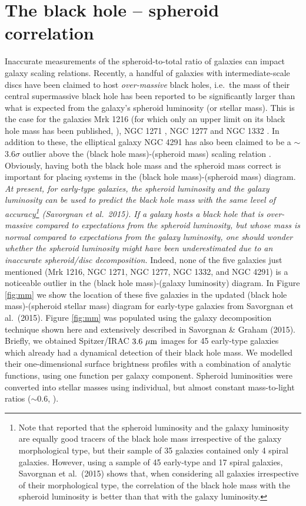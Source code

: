 \documentclass[useAMS,usenatbib,article]{mnras}
\begin{document}
\section{The black hole -- spheroid correlation}
\label{sec:mm}
Inaccurate measurements of the spheroid-to-total ratio of galaxies can impact galaxy scaling relations. 
Recently, a handful of galaxies with intermediate-scale discs have been claimed to host \emph{over-massive} black holes, 
i.e.~the mass of their central supermassive black hole has been reported to be significantly larger 
than what is expected from the galaxy's spheroid luminosity (or stellar mass).
This is the case for the galaxies Mrk 1216 (for which only an upper limit on its black hole mass has been published, 
\citealt{yildirim2015}), NGC 1271 \citep{walsh2015}, 
NGC 1277 \citep{vandenbosch2012,yildirim2015} and NGC 1332 \citep{rusli2011}.
In addition to these, the elliptical galaxy NGC 4291 has also been claimed to be a $\sim$$3.6\sigma$ outlier 
above the (black hole mass)-(spheroid mass) scaling relation \citep{bogdan2012}. 
Obviously, having both the black hole mass and the spheroid mass correct is important 
for placing systems in the (black hole mass)-(spheroid mass) diagram. \\
\emph{At present, for early-type galaxies, the spheroid luminosity and the galaxy luminosity 
can be used to predict the black hole mass with the same level of accuracy\footnote{Note that 
\cite{lasker2014anal} reported that the spheroid luminosity and the galaxy luminosity are equally good tracers of the black hole mass 
irrespective of the galaxy morphological type, but their sample of 35 galaxies contained only 4 spiral galaxies. 
However, using a sample of 45 early-type and 17 spiral galaxies, 
Savorgnan et al.~(2015) shows that, when considering all galaxies irrespective of their morphological type, 
the correlation of the black hole mass with the spheroid luminosity is better than that with the galaxy luminosity.} 
(Savorgnan et al.~2015). 
If a galaxy hosts a black hole that is over-massive compared to expectations from the spheroid luminosity, 
but whose mass is normal compared to expectations from the galaxy luminosity, 
one should wonder whether the spheroid luminosity might have been underestimated 
due to an inaccurate spheroid/disc decomposition. }
Indeed, none of the five galaxies just mentioned (Mrk 1216, NGC 1271, NGC 1277, NGC 1332, and NGC 4291) is a noticeable outlier 
in the (black hole mass)-(galaxy luminosity) diagram. 
In Figure \ref{fig:mm} we show the location of these five galaxies in the updated (black hole mass)-(spheroid stellar mass) diagram 
for early-type galaxies from Savorgnan et al.~(2015). 
Figure \ref{fig:mm} was populated using the galaxy decomposition technique shown here 
and extensively described in Savorgnan \& Graham (2015). 
Briefly, we obtained Spitzer/IRAC $3.6~\rm \mu m$ images for 45 early-type galaxies 
which already had a dynamical detection of their black hole mass. 
We modelled their one-dimensional surface brightness profiles with a combination of analytic functions, 
using one function per galaxy component. 
Spheroid luminosities were converted into stellar masses using individual, 
but almost constant mass-to-light ratios ($\sim$$0.6$, \citealt{meidt2014}). \\
\end{document}
